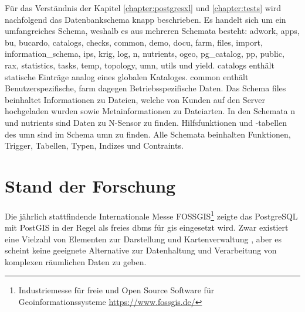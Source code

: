 Für das Verständnis der Kapitel \ref{chapter:postgresxl} und \ref{chapter:tests} wird nachfolgend das Datenbankschema knapp beschrieben.
Es handelt sich um ein umfangreiches Schema, weshalb es aus mehreren Schemata besteht:
adwork, apps, bu, bucardo, catalogs, checks, common, demo, docu, farm, files, import, information\_{}schema, ips, krig, log, n, nutrients, ogeo, pg\_{}catalog, pp, public, rax, statistics, tasks, temp, topology, umn, utils und yield.
catalogs enthält statische Einträge analog eines globalen Kataloges.
common enthält Benutzerspezifische, farm dagegen Betriebsspezifische Daten.
Das Schema files beinhaltet Informationen zu Dateien, welche von Kunden auf den Server hochgeladen wurden sowie Metainformationen zu Dateiarten.
In den Schemata n und nutrients sind Daten zu N-Sensor zu finden.
Hilfsfunktionen und -tabellen des \Gls{umn} sind im Schema umn zu finden.
Alle Schemata beinhalten Funktionen, Trigger, Tabellen, Typen, Indizes und Contraints.



\section{Stand der Forschung}
\label{forschungsstand}

Die jährlich stattfindende Internationale Messe FOSSGIS\footnote{Industriemesse für freie und Open Source Software für Geoinformationssysteme \url{https://www.fossgis.de/}} zeigte das PostgreSQL mit PostGIS in der Regel als freies \Gls{dbms} für \Gls{gis} eingesetzt wird.
Zwar existiert eine Vielzahl von Elementen zur Darstellung und Kartenverwaltung%
, aber es scheint keine geeignete Alternative zur Datenhaltung und Verarbeitung von komplexen räumlichen Daten zu geben.

